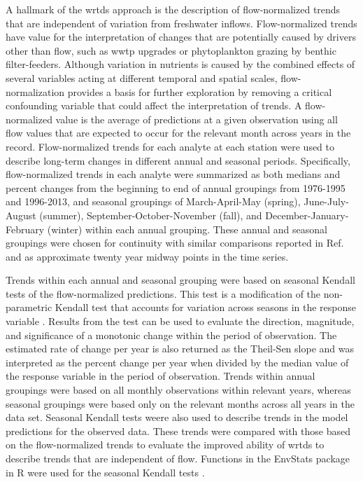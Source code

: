 \documentclass[journal = esthag, manuscript = article]{achemso}\usepackage[]{graphicx}\usepackage[]{color}
\begin{document}
A hallmark of the \ac{wrtds} approach is the description of flow-normalized trends that are independent of variation from freshwater inflows.  Flow-normalized trends have value for the interpretation of changes that are potentially caused by drivers other than  flow, such as \ac{wwtp} upgrades or phytoplankton grazing by benthic filter-feeders\cite{Beck15}. Although variation in nutrients is caused by the combined effects of several variables acting at different temporal and spatial scales, flow-normalization provides a basis for further exploration by removing a critical confounding variable that could affect the interpretation of trends. A flow-normalized value is the average of predictions at a given observation using all flow values that are expected to occur for the relevant month across years in the record.  Flow-normalized trends for each analyte at each station were used to describe long-term changes in different annual and seasonal periods.  Specifically, flow-normalized trends in each analyte were summarized as both medians and percent changes from the beginning to end of annual groupings from 1976-1995 and 1996-2013, and seasonal groupings of March-April-May (spring), June-July-August (summer), September-October-November (fall), and December-January-February (winter) within each annual grouping. These annual and seasonal groupings were chosen for continuity with similar comparisons reported in Ref.~ and as approximate twenty year midway points in the time series.  

Trends within each annual and seasonal grouping were based on seasonal Kendall tests of the flow-normalized predictions. This test is a modification of the non-parametric Kendall test that accounts for variation across seasons in the response variable \cite{Hirsch82}.  Results from the test can be used to evaluate the direction, magnitude, and significance of a monotonic change within the period of observation.  The estimated rate of change per year is also returned as the Theil-Sen slope and was interpreted as the percent change per year when divided by the median value of the response variable in the period of observation.\cite{Jassby08}  Trends within annual groupings were based on all monthly observations within relevant years, whereas seasonal groupings were based only on the relevant months across all years in the data set.  Seasonal Kendall tests weere also used to describe trends in the model predictions for the observed data.  These trends were compared with those based on the flow-normalized trends to evaluate the improved ability of \ac{wrtds} to describe trends that are independent of flow.  Functions in the EnvStats package in R were used for the seasonal Kendall tests \cite{Millard13}. 
\end{document}

